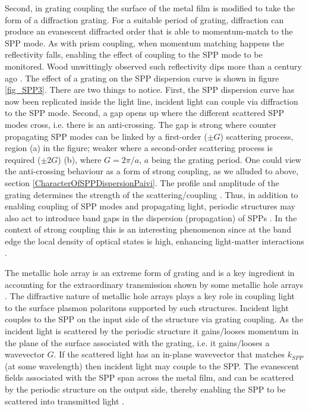 \documentclass[12pt]{iopart}
\begin{document}
Second, in grating coupling the surface of the metal film is modified to take the form of a diffraction grating. For a suitable period of grating, diffraction can produce an evanescent diffracted order that is able to momentum-match to the SPP mode. As with prism coupling, when momentum matching happens the reflectivity falls, enabling the effect of coupling to the SPP mode to be monitored. Wood unwittingly observed such reflectivity dips more than a century ago \cite{Wood_PhilMag_1902_4_396}. The effect of a grating on the SPP dispersion curve is shown in figure \ref{fig_SPP3}. There are two things to notice. First, the SPP dispersion curve has now been replicated inside the light line, incident light can couple via diffraction to the SPP mode. Second, a gap opens up where the different scattered SPP modes cross, i.e. there is an anti-crossing. The gap is strong where counter propagating SPP modes can be linked by a first-order ($\pm G$) scattering process, region (a) in the figure; weaker where a second-order scattering process is required ($\pm 2G$) (b), where $G=2\pi/a$, $a$ being the grating period. One could view the anti-crossing behaviour as a form of strong coupling, 
as we alluded to above, section \ref{CharacterOfSPPDispersionPaivi}. The profile and amplitude of the grating determines the strength of the scattering/coupling \cite{Barnes_PRB_1996_54_6227}. Thus, in addition to enabling coupling of SPP modes and propagating light, periodic structures may also act to introduce band gaps in the dispersion (propagation) of SPPs \cite{Kitson_PRB_1995_52_11441}. In the context of strong coupling this is an interesting phenomenon since at the band edge the local density of optical states is high, enhancing light-matter interactions \cite{Turnbull_PRB_2001_64_125122}. 

The metallic hole array is an extreme form of grating and is a key ingredient in accounting for the extraordinary transmission shown by some metallic hole arrays \cite{Ebbesen_Nature_1998_391_667}. The diffractive nature of metallic hole arrays plays a key role in coupling light to the surface plasmon polaritons supported by such structures. Incident light couples to the SPP on the input side of the structure via grating coupling. As the incident light is scattered by the periodic structure it gains/looses momentum in the plane of the surface associated with the grating, i.e. it gains/looses a wavevector $G$. If the scattered light has an in-plane wavevector that matches $k_{SPP}$ (at some wavelength) then incident light may couple to the SPP. The evanescent fields associated with the SPP span across the metal film, and can be scattered by the periodic structure on the output side, thereby enabling the SPP to be scattered 
into transmitted light \cite{Garcia-Vidal_RMP_2010_82_729}.
\end{document}
